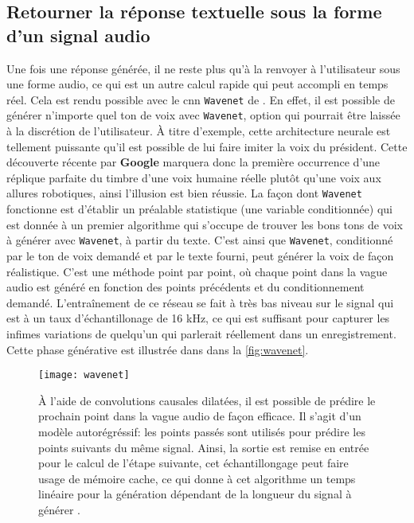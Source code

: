 \subsection{Retourner la réponse textuelle sous la forme d'un signal audio}
Une fois une réponse générée, il ne reste plus qu'à la renvoyer à l'utilisateur sous une forme audio, ce qui est un autre calcul rapide qui peut accompli en temps réel. Cela est rendu possible avec le \gls{cnn} \texttt{Wavenet} de \cite{wavenet}. En effet, il est possible de générer n’importe quel ton de voix avec \texttt{Wavenet}, option qui pourrait être laissée à la discrétion de l’utilisateur. À titre d’exemple, cette architecture neurale est tellement puissante qu’il est possible de lui faire imiter la voix du président. Cette découverte récente par \textbf{Google} marquera donc la première occurrence d'une réplique parfaite du timbre d'une voix humaine réelle plutôt qu’une voix aux allures robotiques, ainsi l’illusion est bien réussie. La façon dont \texttt{Wavenet} fonctionne est d’établir un préalable statistique (une variable conditionnée) qui est donnée à un premier algorithme qui s’occupe de trouver les bons tons de voix à générer avec \texttt{Wavenet}, à partir du texte. C’est ainsi que \texttt{Wavenet}, conditionné par le ton de voix demandé et par le texte fourni, peut générer la voix de façon réalistique. C’est une méthode point par point, où chaque point dans la vague audio est généré en fonction des points précédents et du conditionnement demandé. L'entraînement de ce réseau se fait à très bas niveau sur le signal qui est à un taux d’échantillonage de 16 kHz, ce qui est suffisant pour capturer les infimes variations de quelqu’un qui parlerait réellement dans un enregistrement. Cette phase générative est illustrée dans dans la \autoref{fig:wavenet}.

\begin{figure*}
  \centering
  \texttt{[image: wavenet]}
  \caption{À l’aide de convolutions causales dilatées, il est possible de prédire le prochain point dans la vague audio de façon efficace. Il s'agit d'un modèle autorégréssif: les points passés sont utilisés pour prédire les points suivants du même signal. Ainsi, la sortie est remise en entrée pour le calcul de l’étape suivante, cet échantillongage peut faire usage de mémoire cache, ce qui donne à cet algorithme un temps linéaire pour la génération dépendant de la longueur du signal à générer \cite{wavenet}.}
  \label{fig:wavenet}
\end{figure*}
